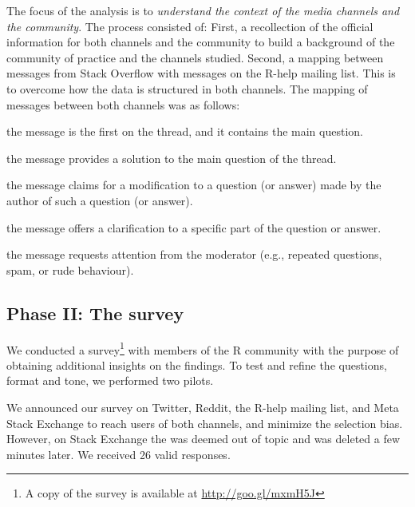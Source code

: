 	The focus of the analysis is to \textit{understand the context of the media channels and the community}.
	The process consisted of:
	First, a recollection of the official information for both channels and the community to build a background of the community of practice and the channels studied.
	Second, a mapping between messages from Stack Overflow with messages on the R-help mailing list.
    This is to overcome how the data is structured in both channels.
    The mapping of messages between both channels was as follows:

	\begin{description}[itemsep=3pt, topsep=2pt, leftmargin=1em, parsep=0pt]
		\item[Question:] the message is the first on the thread, and it contains the main question.
		\item[Answer:] the message provides a solution to the main question of the thread.
	 	\item[Update:] the message claims for a modification to a question (or answer) made by the author of such a question (or answer).
		\item[Comment:] the message offers a clarification to a specific part of the question or answer.
		\item[Flag:] the message requests attention from the moderator (e.g., repeated questions, spam, or rude behaviour).
	\end{description}


\subsection{Phase II: The survey} 


    We conducted a survey\footnote{A copy of the survey is available at \url{http://goo.gl/mxmH5J}} with members of the R community with the purpose of obtaining additional insights on the findings.
    To test and refine the questions, format and tone, we performed two pilots.
    
    We announced our survey on Twitter, Reddit, the R-help mailing list, and Meta Stack Exchange to reach users of both channels, and minimize the selection bias.
    However, on Stack Exchange the was deemed out of topic and was deleted a few minutes later. We received 26 valid responses.

